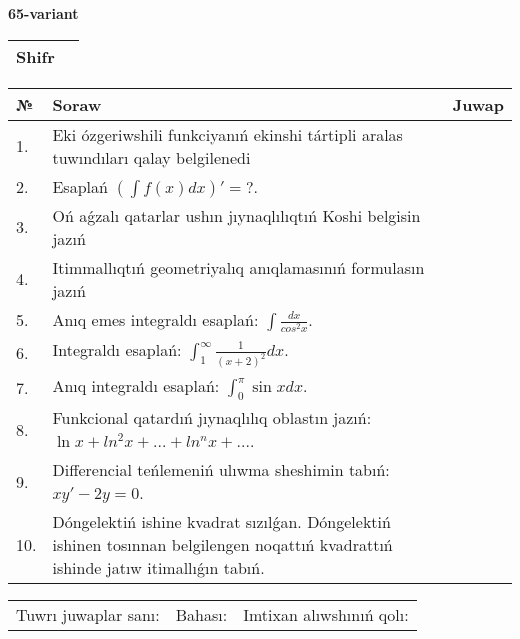 \documentclass{article}
\begin{document}
  \egroup
  
  \newpage
  
  
  \textbf{65-variant}\\
  
  \bgroup
  \def\arraystretch{1.6} %
  
  \begin{tabular}{|m{5.7cm}|m{9.5cm}|}
  \hline
  Shifr & \\
  \hline
  \end{tabular}
  
  \vspace{1cm}
  
  \begin{tabular}{|m{0.7cm}|m{10cm}|m{4cm}|}
  \hline
  № & Soraw & Juwap \\
  \hline
  1. & Eki ózgeriwshili funkciyanıń ekinshi tártipli aralas tuwındıları qalay belgilenedi &  \\
  \hline
  2. & Esaplań \(\left( \int{f(x)dx} \right)' = ?\). &  \\
  \hline
  3. & Oń aǵzalı qatarlar ushın jıynaqlılıqtıń Koshi belgisin jazıń &  \\
  \hline
  4. & Itimmallıqtıń geometriyalıq anıqlamasınıń formulasın jazıń &  \\
  \hline
  5. & Anıq emes integraldı esaplań: \(\int\frac{dx}{cos^2 x}\). &  \\
  \hline
  6. & Integraldı esaplań: \(\int_{1}^{\infty}{\frac{1}{(x + 2)^2 }dx}\). &  \\
  \hline
  7. & Anıq integraldı esaplań: \(\int_{0}^{\pi}{\sin xdx}\). &  \\
  \hline
  8. & Funkcional qatardıń jıynaqlılıq oblastın jazıń: \(\ln x + ln^2 x + ... + ln^{n}x + ...\). &  \\
  \hline
  9. & Differencial teńlemeniń ulıwma sheshimin tabıń: \(xy' - 2y = 0\). &  \\
  \hline
  10. & Dóngelektiń ishine kvadrat sızılǵan. Dóngelektiń ishinen tosınnan belgilengen noqattıń kvadrattıń ishinde jatıw itimallıǵın tabıń. &  \\
  \hline
  \end{tabular}
  
  \vspace{1cm}
  
  \begin{tabular}{lll}
  Tuwrı juwaplar sanı: \underline{\hspace{1.5cm}} & 
  Bahası: \underline{\hspace{1.5cm}} & 
  Imtixan alıwshınıń qolı: \underline{\hspace{2cm}} \\
  \end{tabular}
  
\end{document}
